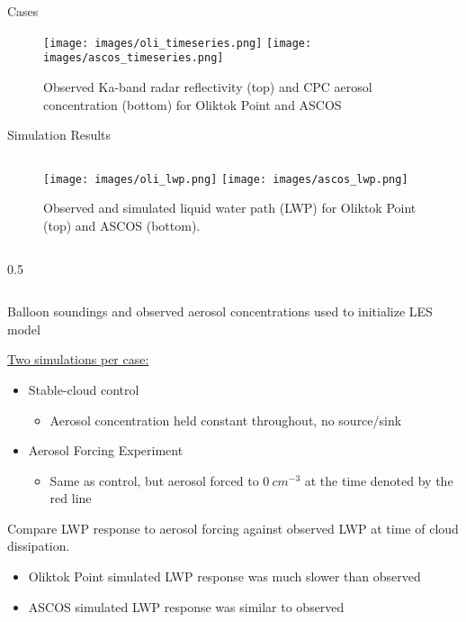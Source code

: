 \documentclass[final]{beamer}
\newlength{\sepwid}
\newlength{\twocolwid}
\begin{document}
\begin{frame}[t]
\begin{columns}[t]
\begin{column}{\twocolwid}
\begin{block}{Cases}
			\begin{figure}
				\centering
				\texttt{[image: images/oli\_timeseries.png]}
				\texttt{[image: images/ascos\_timeseries.png]}
				\caption{Observed Ka-band radar reflectivity (top) and CPC aerosol concentration (bottom) for Oliktok Point and ASCOS}
			\end{figure}	
	\end{block}

	\begin{alertblock}{Simulation Results}
		\begin{column}{0.59\linewidth}
			\begin{figure}
				\centering
				\texttt{[image: images/oli\_lwp.png]}
				\texttt{[image: images/ascos\_lwp.png]}
				\caption{Observed and simulated liquid water path (LWP) for Oliktok Point (top) and ASCOS (bottom).}
			\end{figure}
		\end{column}
		\begin{column}{0.5\sepwid}\end{column}
		\begin{column}{0.39\linewidth}
			Balloon soundings and observed aerosol concentrations used to initialize LES model
			\vspace{0.1 em}

			\underline{Two simulations per case:}
			\begin{itemize}
				\item Stable-cloud control
				\begin{itemize}
					\item Aerosol concentration held constant throughout, no source/sink
				\end{itemize}
				\item Aerosol Forcing Experiment
				\begin{itemize}
					\item Same as control, but aerosol forced to $0\ cm^{-3}$ at the time denoted by the red line
				\end{itemize}
			\end{itemize}
			\vspace{0.1em}
			Compare LWP response to aerosol forcing against observed LWP at time of cloud dissipation.
			\begin{itemize}
				\item Oliktok Point simulated LWP response was much slower than observed
				\item ASCOS simulated LWP response was similar to observed
			\end{itemize}
		\end{column}
	\end{alertblock}
\end{column}




\end{columns}
\end{frame}
\end{document}

